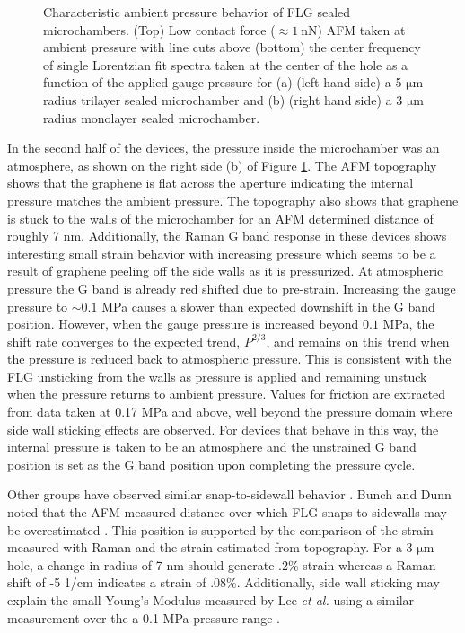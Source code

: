 \begin{figure}
	\begin{center}
	
	\end{center}
	\caption[Characteristic ambient pressure behavior of FLG sealed microchambers]{\label{fig:fri:ambient}Characteristic ambient pressure behavior of FLG sealed microchambers. (Top) Low contact force ($\approx 1\ \mathrm{nN}$) AFM taken at ambient pressure with line cuts above (bottom) the center frequency of single Lorentzian fit spectra taken at the center of the hole as a function of the applied gauge pressure for (a) (left hand side) a 5 $\mathrm{\mu}$m radius trilayer sealed microchamber and (b) (right hand side) a 3 $\mathrm{\mu}$m radius monolayer sealed microchamber.}
\end{figure}

In the second half of the devices, the pressure inside the microchamber was an atmosphere, as shown on the right side (b) of Figure \ref{fig:fri:ambient}.
The AFM topography shows that the graphene is flat across the aperture indicating the internal pressure matches the ambient pressure.
The topography also shows that graphene is stuck to the walls of the microchamber for an AFM determined distance of roughly 7 nm.
Additionally, the Raman G band response in these devices shows interesting small strain behavior with increasing pressure which seems to be a result of graphene peeling off the side walls as it is pressurized.
At atmospheric pressure the G band is already red shifted due to pre-strain.
Increasing the gauge pressure to $\sim 0.1$ MPa causes a slower than expected downshift in the G band position.
However, when the gauge pressure is increased beyond $0.1$ MPa, the shift rate converges to the expected trend, $P^{2/3}$, and remains on this trend when the pressure is reduced back to atmospheric pressure.
This is consistent with the FLG unsticking from the walls as pressure is applied and remaining unstuck when the pressure returns to ambient pressure.
Values for friction are extracted from data taken at 0.17 MPa and above, well beyond the pressure domain where side wall sticking effects are observed.
For devices that behave in this way, the internal pressure is taken to be an atmosphere and the unstrained G band position is set as the G band position upon completing the pressure cycle.

Other groups have observed similar snap-to-sidewall behavior \cite{Lee2008,Bunch2008}.
Bunch and Dunn noted that the AFM measured distance over which FLG snaps to sidewalls may be overestimated \cite{Bunch2012}.
This position is supported by the comparison of the strain measured with Raman and the strain estimated from topography.
For a 3 $\mathrm{\mu}$m hole, a change in radius of 7 nm should generate .2\% strain whereas a Raman shift of -5 1/cm indicates a strain of .08\%.
Additionally, side wall sticking may explain the small Young's Modulus measured by Lee \textit{et al.} using a similar measurement over the a 0.1 MPa pressure range \cite{Lee2012}.

